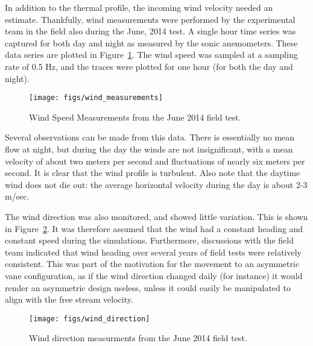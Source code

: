 In addition to the thermal profile, the incoming wind velocity needed an 
estimate. Thankfully, wind measurements were performed by the
experimental team in the field also during the June, 2014 test. A single 
hour time series was captured for both day and night as measured by the
sonic anemometers. These data series are plotted in
Figure~\ref{fig:wind_speed_estimate}. The wind speed was sampled at a
sampling rate of 0.5 Hz, and the traces were plotted for one hour (for
both the day and night). 

 \begin{figure}[!htb]
  \begin{center}
   \texttt{[image: figs/wind\_measurements]}
   \caption{Wind Speed Measurements from the June 2014 field test.}
   \label{fig:wind_speed_estimate}
  \end{center}
 \end{figure}

Several observations can be made from this data. There is essentially no
mean flow at night, but during the day the winds are not insignificant,
with a mean velocity of about two meters per second and fluctuations of
nearly six meters per second. It is clear that the wind profile is
turbulent.  Also note that the daytime wind does not die out: the
average horizontal velocity during the day is about 2-3 m/sec. 

The wind direction was also monitored, and showed little variation. 
This is shown in Figure~\ref{fig:wind_direction}. It was therefore
assumed that the wind had a constant heading and constant speed during
the simulations. Furthermore, discussions with the field team indicated
that wind heading over several years of field tests were relatively
consistent. This was part of the motivation for the movement to an
asymmetric vane configuration, as if the wind direction changed daily
(for instance) it would render an asymmetric design useless, unless it
could easily be manipulated to align with the free stream velocity. 

 \begin{figure}[!htb]
  \begin{center}
   \texttt{[image: figs/wind\_direction]}
   \caption{Wind direction measurments from the June 2014 field test.}
   \label{fig:wind_direction}
  \end{center}
 \end{figure}




